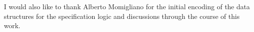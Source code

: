 \documentclass[12pt]{UOthesis}
\theoremstyle{remarkstyle}
\begin{document}
I would also like to thank Alberto Momigliano for the initial encoding of the data structures for the specification logic and discussions through the course of this work.

\cleardoublepage

\tableofcontents
\cleardoublepage

\ListOfFigures
\cleardoublepage

\listoftheorems
\cleardoublepage


%
%
%
\PrintNomenclature
\cleardoublepage

%
\end{document}
